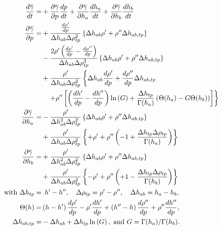 \documentclass[11pt]{article} %
\begin{document}
\begin{align}
\frac{d\overline{\gamma}}{dt}  =& + \frac{\partial \overline{\gamma}}{\partial p}\frac{dp}{dt} + \frac{\partial \overline{\gamma}}{\partial h_a}\frac{dh_a}{dt} + \frac{\partial \overline{\gamma}}{\partial h_b}\frac{dh_b}{dt} \label{eqn:dgammabardt} \\
%
\frac{\partial \overline{\gamma}}{\partial p}=&+{\frac{\frac{d\rhop}{dp}}{\dhab\drtp^2}\left\lbrace{\dhab\rhop+\rhopp\dhabtp}\right\rbrace}\nonumber\\
&-{\frac{2\rhop\left(\frac{d\rhop}{dp}-\frac{d\rhopp}{dp}\right)}{\dhab\drtp^3}\left\lbrace{\dhab\rhop+\rhopp\dhabtp}\right\rbrace}\nonumber\\
&+{\frac\rhop{\dhab\drtp^2}\left\lbrace{{\dhab{\frac{d\rhop}{dp}}}+\frac{d\rhopp}{dp}\dhabtp}\right.}\nonumber\\
&\quad\left.{+\rhopp\left[{\left({\frac{d\hp}{dp}-\frac{d\hpp}{dp}}\right)\ln\left({G}\right)+\frac{\dhtp}{\Gamma(h_a)}\left({\Theta(h_a)-G\Theta(h_b)}\right)}\right]}\right\rbrace
%
\label{eqn:dgammabardp}\\
%
\frac{\partial \overline{\gamma}}{\partial h_a}=&
-{\frac\rhop{\dhab^{2}\drtp^{2}}\left\lbrace{\dhab\rhop+\rhopp\dhabtp}\right\rbrace}\nonumber\\
&+{\frac\rhop{\dhab\drtp^{2}}\left\lbrace+\rhop+\rhopp\left(-1+\frac{\dhtp\drtp}{\Gamma(h_a)}\right)\right\rbrace}\label{eqn:dgammabardha}\\
%
\frac{\partial \overline{\gamma}}{\partial h_b}=&
+{\frac\rhop{\dhab^{2}\drtp^{2}}\left\lbrace{\dhab\rhop+\rhopp\dhabtp}\right\rbrace}\nonumber\\
&+{\frac\rhop{\dhab\drtp^{2}}\left\lbrace-\rhop+\rhopp\left(+1-\frac{\dhtp\drtp}{\Gamma(h_b)}\right)\right\rbrace}\label{eqn:dgammabardhb}\\
%
\text{ with } 
\dhtp     =&\;\, \hp-\hpp, \quad \drtp = \rhop-\rhopp, \quad \dhab = h_a-h_b, \nonumber\\
\Theta(h) =& \left(h-\hp\right)\frac{d\rhop}{dp}-\rhop\frac{d\hp}{dp}+\left(\hpp-h\right)\frac{d\rhopp}{dp}+\rhopp\frac{d\hpp}{dp}, \nonumber\\
\dhabtp   =& -\dhab+\dhtp\ln\left(G\right), \text{ and } G = \Gamma(h_a) / \Gamma(h_b) \text{. } \nonumber
\end{align}


\end{document}
